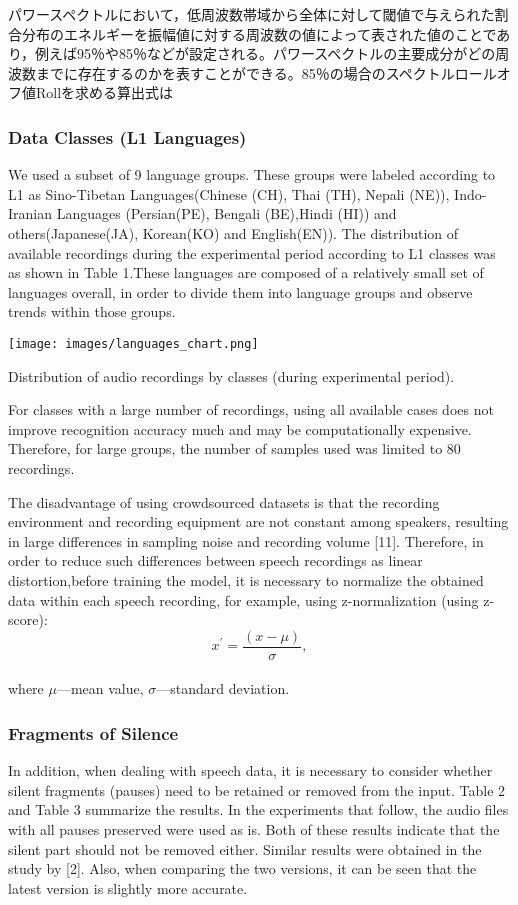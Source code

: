 パワースペクトルにおいて，低周波数帯域から全体に対して閾値で与えられた割合分布のエネルギーを振幅値に対する周波数の値によって表された値のことであり，例えば95％や85％などが設定される。パワースペクトルの主要成分がどの周波数までに存在するのかを表すことができる。85％の場合のスペクトルロールオフ値Rollを求める算出式は\documentclass[ams]{U-AizuGT}
\begin{document}
\subsubsection{Data Classes (L1 Languages)}
We used a subset of 9 language groups. These groups were labeled according to L1 as Sino-Tibetan Languages(Chinese (CH), Thai (TH), Nepali (NE)), Indo-Iranian Languages (Persian(PE), Bengali (BE),Hindi (HI)) and others(Japanese(JA), Korean(KO) and English(EN)). The distribution of available recordings during the experimental period according to L1 classes was as shown in Table 1.These languages are composed of a relatively small set of languages overall, in order to divide them into language groups and observe trends within those groups.
\begin{table}[h]
    \centering
    \texttt{[image: images/languages\_chart.png]}
    \caption{Distribution of audio recordings by classes (during experimental period).}
    
\end{table}
For classes with a large number of recordings, using all available cases does not improve recognition accuracy much and may be computationally expensive. Therefore, for large groups, the number of samples used was limited to 80 recordings.\par
The disadvantage of using crowdsourced datasets is that the recording environment and recording equipment are not constant among speakers, resulting in large differences in sampling noise and recording volume [11]. Therefore, in order to reduce such differences between speech recordings as linear distortion,before training the model, it is necessary to normalize the obtained data within each speech recording, for example, using z-normalization (using z-score):
\\
\begin{equation}
x^{\prime}=\frac{(x-\mu)}{\sigma},
\end{equation}
\\
where $\mu$---mean value, $\sigma$---standard deviation.
\subsubsection{Fragments of Silence}
In addition, when dealing with speech data, it is necessary to consider whether silent fragments (pauses) need to be retained or removed from the input. Table 2 and Table 3 summarize the results. In the experiments that follow, the audio files with all pauses preserved were used as is. Both of these results indicate that the silent part should not be removed either. Similar results were obtained in the study by [2]. Also, when comparing the two versions, it can be seen that the latest version is slightly more accurate.
\end{document}
